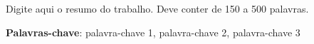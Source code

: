 
Digite aqui o resumo do trabalho. Deve conter de 150 a 500 palavras.

\textbf{Palavras-chave}: palavra-chave 1, palavra-chave 2, palavra-chave 3